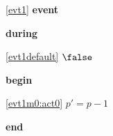 \noindent \ref{evt1}  \textbf{event}
\begin{block}
\item \textbf{during}
\begin{block}
\item[ \eqref{evt1default} ]$\false $ %
\end{block}
\item \textbf{begin}
\begin{block}
\item[ \eqref{evt1m0:act0} ]$p' = p-1 $ %
\end{block}
\item \textbf{end} \\
\end{block}
